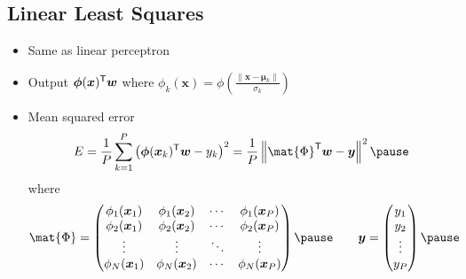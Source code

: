 \begin{slide}
\section[-1.5]{Linear Least Squares}

\begin{PauseHighLight}

\begin{itemize}\squeeze
\item Same as linear perceptron\pause
\item Output $\bm{\phi}(\bm{x})^{\textsf{T}}\bm{w}$ where $\phi_k(\bm{x}) =
  \phi\!\left(\frac{\|\bm{x}-\bm{\mu}_k\|}{\sigma_k}\right)$\pause
\item Mean squared error
  \begin{displaymath}
    E = \frac{1}{P} \sum_{k=1}^P \left( \strut \bm{\phi}(\bm{x}_k)^\tr \bm{w}
    -y_k \right)^2 = \frac{1}{P} \left\| \strut \mat{\Phi}^\tr \bm{w} -
    \bm{y}  \right\|^2\pause
  \end{displaymath}
where
\begin{displaymath}
  \mat{\Phi} = 
  \begin{pmatrix}
    \phi_1(\bm{x}_1) & \phi_1(\bm{x}_2) & \cdots & \phi_1(\bm{x}_P) \\
    \phi_2(\bm{x}_1) & \phi_2(\bm{x}_2) & \cdots & \phi_2(\bm{x}_P) \\
    \vdots & \vdots & \ddots & \vdots \\
    \phi_N(\bm{x}_1) & \phi_N(\bm{x}_2) & \cdots & \phi_N(\bm{x}_P) \\
  \end{pmatrix}\pause \hspace{2em}
  \bm{y} = 
  \begin{pmatrix}
    y_1 \\ y_2 \\ \vdots \\ y_P
  \end{pmatrix}\pause
\end{displaymath}
\end{itemize}

\end{PauseHighLight}
\end{slide}


